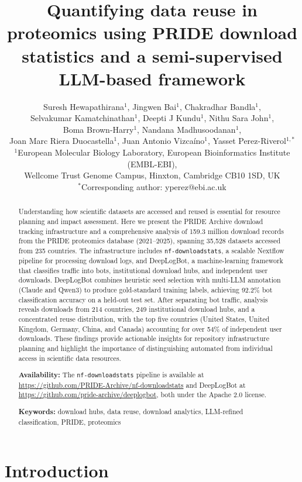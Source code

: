 \documentclass[11pt,a4paper]{article}
\title{\textbf{Quantifying data reuse in proteomics using PRIDE download statistics and a semi-supervised LLM-based framework}}
\author{
    Suresh Hewapathirana$^{1}$, Jingwen Bai$^{1}$, Chakradhar Bandla$^{1}$,\\
    Selvakumar Kamatchinathan$^{1}$, Deepti J Kundu$^{1}$, Nithu Sara John$^{1}$,\\
    Boma Brown-Harry$^{1}$, Nandana Madhusoodanan$^{1}$,\\
    Joan Marc Riera Duocastella$^{1}$, Juan Antonio Vizca\'{i}no$^{1}$, Yasset Perez-Riverol$^{1,*}$\\[0.5em]
    \small $^{1}$European Molecular Biology Laboratory, European Bioinformatics Institute (EMBL-EBI),\\
    \small Wellcome Trust Genome Campus, Hinxton, Cambridge CB10 1SD, UK\\
    \small $^{*}$Corresponding author: yperez@ebi.ac.uk
}
\date{}
\begin{document}
\maketitle

\begin{abstract}
Understanding how scientific datasets are accessed and reused is essential for resource planning and impact assessment. Here we present the PRIDE Archive download tracking infrastructure and a comprehensive analysis of 159.3 million download records from the PRIDE proteomics database (2021--2025), spanning 35,528 datasets accessed from 235 countries. The infrastructure includes \texttt{nf-downloadstats}, a scalable Nextflow pipeline for processing download logs, and DeepLogBot, a machine-learning framework that classifies traffic into bots, institutional download hubs, and independent user downloads. DeepLogBot combines heuristic seed selection with multi-LLM annotation (Claude and Qwen3) to produce gold-standard training labels, achieving 92.2\% bot classification accuracy on a held-out test set. After separating bot traffic, analysis reveals downloads from 214 countries, 249 institutional download hubs, and a concentrated reuse distribution, with the top five countries (United States, United Kingdom, Germany, China, and Canada) accounting for over 54\% of independent user downloads. These findings provide actionable insights for repository infrastructure planning and highlight the importance of distinguishing automated from individual access in scientific data resources.

\begin{sloppypar}
\noindent\textbf{Availability:} The \texttt{nf-downloadstats} pipeline is available at \url{https://github.com/PRIDE-Archive/nf-downloadstats} and DeepLogBot at \url{https://github.com/pride-archive/deeplogbot}, both under the Apache 2.0 license.
\end{sloppypar}

\noindent\textbf{Keywords:} download hubs, data reuse, download analytics, LLM-refined classification, PRIDE, proteomics
\end{abstract}

\section{Introduction}
\end{document}
